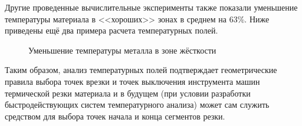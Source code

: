 \documentclass[11pt,twoside]{report}
\begin{document}
Другие проведенные вычислительные эксперименты
также показали уменьшение температуры материала
в <<хороших>> зонах в среднем на 63\%.
Ниже приведены ещё два примера расчета температурных полей.

\begin{figure}
  \centering
  \caption{Уменьшение температуры металла в зоне жёсткости }
  \label{thermal-309-120}
\end{figure}

Таким образом,
анализ температурных полей подтверждает
геометрические правила выбора точек врезки
и точек выключения инструмента машин термической
резки материала и в будущем
(при условии разработки быстродействующих систем температурного анализа)
может сам служить средством для выбора точек начала и конца сегментов резки.
\end{document}
